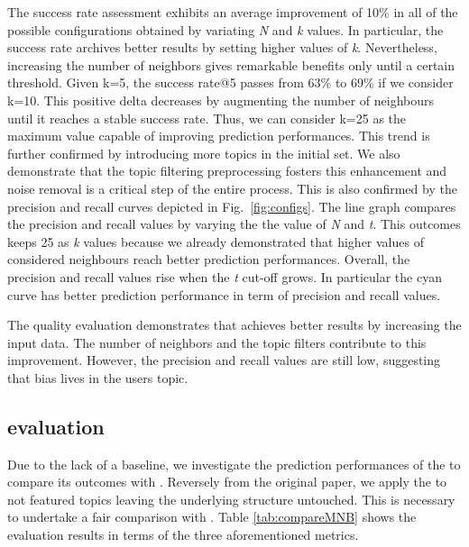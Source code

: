 The success rate assessment exhibits an average improvement of 10\% in all of the possible configurations obtained by variating \emph{N} and \emph{k} values. In particular, the success rate archives better results by setting higher values of \emph{k}. Nevertheless, increasing the number of neighbors gives remarkable benefits only until a certain threshold. Given k=5, the success rate@5 passes from 63\% to 69\% if we consider k=10. This positive delta decreases by augmenting the number of neighbours until it reaches a stable success rate. Thus, we can consider k=25 as the maximum value capable of improving prediction performances. This trend is further confirmed by introducing more topics in the initial set. We also demonstrate that the topic filtering preprocessing fosters this enhancement and noise removal is a critical step of the entire process.
This is also confirmed by the precision and recall curves depicted in Fig.~\ref{fig:configs}. The line graph compares the precision and recall values by varying the the value of \emph{N} and \emph{t}. This outcomes keeps 25 as \emph{k} values because we already demonstrated that higher values of considered neighbours reach better prediction performances. Overall, the precision and recall values rise when the \emph{t} cut-off grows. In particular the cyan curve has better prediction performance in term of precision and recall values.

\begin{tcolorbox}[boxrule=0.86pt,left=0.3em, right=0.3em,top=0.1em, bottom=0.05em]
The quality evaluation demonstrates that \CT achieves better results by increasing the input data. The number of neighbors and the topic filters contribute to this improvement. However, the precision and recall values are still low, suggesting that bias lives in the users topic.
\end{tcolorbox}


\subsection{\MNB evaluation} \label{sec:EXP2}

\rqsecond

Due to the lack of a baseline, we investigate the prediction performances of the \MNB to compare its outcomes with \CT. Reversely from the original paper, we apply the \MNB to not featured topics leaving the underlying structure untouched. This is necessary to undertake a fair comparison with \CT. Table \ref{tab:compareMNB} shows the evaluation results in terms  of the three aforementioned metrics. 


